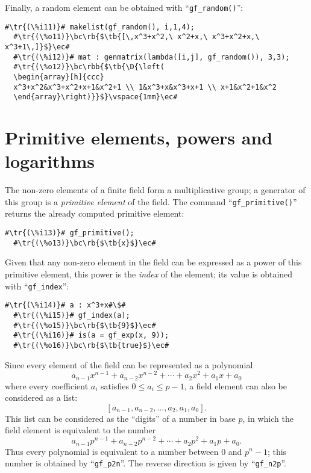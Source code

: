 \documentclass[a4paper,11pt,leqno,fleqn]{artikel3}
\newcommand{\D}{\displaystyle}
\newcommand{\bc}{\begin{center}}
\newcommand{\ec}{\end{center}}
\newcommand{\tr}[1]{\textcolor{red}{#1}}
\newcommand{\tb}[1]{\textcolor{blue}{#1}}
\newcommand{\rb}[1]{\raisebox{2mm}[0mm][1mm]{#1}}
\newcommand{\rbb}[1]{\raisebox{-4mm}[0mm][9mm]{#1}}
\begin{document}
Finally, a random element can be obtained with ``\verb!gf_random()!'':

\vspace*{2mm}
\begin{lstlisting}[escapechar=\#]
  #\tr{(\%i11)}# makelist(gf_random(), i,1,4);
  #\tr{(\%o11)}\bc\rb{$\tb{[\,x^3+x^2,\ x^2+x,\ x^3+x^2+x,\ x^3+1\,]}$}\ec#
  #\tr{(\%i12)}# mat : genmatrix(lambda([i,j], gf_random()), 3,3);
  #\tr{(\%o12)}\bc\rbb{$\tb{\D{\left(
  \begin{array}[h]{ccc}
  x^3+x^2&x^3+x^2+x+1&x^2+1 \\ 1&x^3+x&x^3+x+1 \\ x+1&x^2+1&x^2
  \end{array}\right)}}$}\vspace{1mm}\ec#
\end{lstlisting}


\section*{Primitive elements, powers and logarithms}

The non-zero elements of a finite field form a multiplicative group; a
generator of this group is a \emph{primitive element} of the field.  The
command ``\verb!gf_primitive()!'' returns the already computed primitive element:

\vspace*{2mm}
\begin{lstlisting}[escapechar=\#]
  #\tr{(\%i13)}# gf_primitive();
  #\tr{(\%o13)}\bc\rb{$\tb{x}$}\ec#
\end{lstlisting}

Given that any non-zero element in the field can be expressed as a power of
this primitive element, this power is the \emph{index} of the element; its
value is obtained with ``\verb!gf_index!'':

\vspace*{2mm}
\begin{lstlisting}[escapechar=\#]
  #\tr{(\%i14)}# a : x^3+x#\$#
  #\tr{(\%i15)}# gf_index(a);
  #\tr{(\%o15)}\bc\rb{$\tb{9}$}\ec#
  #\tr{(\%i16)}# is(a = gf_exp(x, 9));
  #\tr{(\%o16)}\bc\rb{$\tb{true}$}\ec#
\end{lstlisting}

Since every element of the field can be represented as a polynomial
\[
a_{n-1}x^{n-1}+a_{n-2}x^{n-2}+\cdots+a_2x^2+a_1x+a_0
\]
where every coefficient $a_i$ satisfies $0\le a_i\le p-1$, a field element can
also be considered as a list:
\[
[a_{n-1},a_{n-2},\ldots,a_2,a_1,a_0].
\]
This list can be considered as the ``digits'' of a number in base $p$, in
which the field element is equivalent to the number
\[
a_{n-1}p^{n-1}+a_{n-2}p^{n-2}+\cdots+a_2p^2+a_1p+a_0.
\]
Thus every polynomial is equivalent to a number between 0 and $p^n-1$; this
number is obtained by ``\texttt{gf\_p2n}''. 
The reverse direction is given by ``\texttt{gf\_n2p}''.
\end{document}
